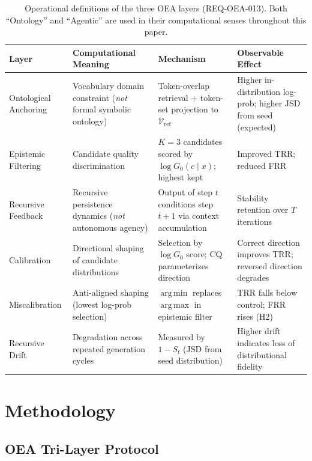 \documentclass[11pt]{article}
\DeclareMathOperator*{\argmax}{arg\,max}
\DeclareMathOperator*{\argmin}{arg\,min}
\begin{document}
\begin{table}[h]
\centering
\small
\begin{tabular}{p{2.2cm}p{3.3cm}p{3.3cm}p{3.3cm}}
\toprule
Layer & Computational Meaning & Mechanism & Observable Effect \\
\midrule
Ontological Anchoring
  & Vocabulary domain constraint (\emph{not} formal symbolic ontology)
  & Token-overlap retrieval + token-set projection to $\mathcal{V}_{\mathrm{ref}}$
  & Higher in-distribution log-prob; higher JSD from seed (expected) \\[4pt]
Epistemic Filtering
  & Candidate quality discrimination
  & $K{=}3$ candidates scored by $\log G_0(c \mid x)$; highest kept
  & Improved TRR; reduced FRR \\[4pt]
Recursive Feedback
  & Recursive persistence dynamics (\emph{not} autonomous agency)
  & Output of step $t$ conditions step $t{+}1$ via context accumulation
  & Stability retention over $T$ iterations \\[4pt]
Calibration
  & Directional shaping of candidate distributions
  & Selection by $\log G_0$ score; CQ parameterizes direction
  & Correct direction improves TRR; reversed direction degrades \\[4pt]
Miscalibration
  & Anti-aligned shaping (lowest log-prob selection)
  & $\argmin$ replaces $\argmax$ in epistemic filter
  & TRR falls below control; FRR rises (H2) \\[4pt]
Recursive Drift
  & Degradation across repeated generation cycles
  & Measured by $1 - S_t$ (JSD from seed distribution)
  & Higher drift indicates loss of distributional fidelity \\
\bottomrule
\end{tabular}
\caption{Operational definitions of the three OEA layers (REQ-OEA-013). Both ``Ontology'' and ``Agentic'' are used in their computational senses throughout this paper.}
\label{tab:operational}
\end{table}

\section{Methodology}
\label{sec:methodology}

\subsection{OEA Tri-Layer Protocol}
\end{document}
